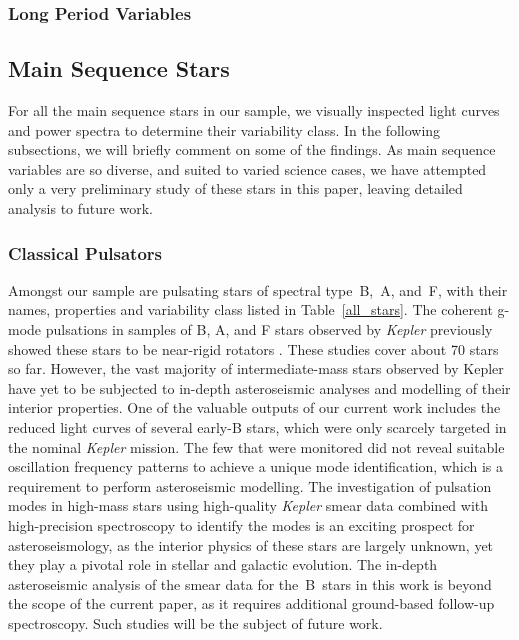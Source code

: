 \documentclass[a4paper,fleqn,usenatbib]{mnras}
\newcommand{\kepler}{\emph{Kepler}\xspace}
\begin{document}
\subsubsection{Long Period Variables}
\label{lpvs}

\subsection{Main Sequence Stars}
\label{mainseq}

For all the main sequence stars in our sample, we visually inspected light curves and power spectra to determine their variability class. In the following subsections, we will briefly comment on some of the findings. As main sequence variables are so diverse, and suited to varied science cases, we have attempted only a very preliminary study of these stars in this paper, leaving detailed analysis to future work.

\subsubsection{Classical Pulsators}
\label{pulsators}

Amongst our sample are pulsating stars of spectral type~B,~A, and~F, with their names, properties and variability class listed in Table~\ref{all_stars}. The coherent g-mode pulsations in samples of B, A, and F stars observed by \kepler previously showed these stars to be near-rigid rotators \citep{kurtz2014,saio15,triana15,vanreeth15,vanreeth16,vanreeth18,murphy16,schmid16,moravveji16,ouazzani17,papics17,aerts17,szewczuk18}. These studies cover about 70 stars so far. However, the vast majority of intermediate-mass stars observed by Kepler have yet to be subjected to in-depth asteroseismic analyses and modelling of their interior properties. One of the valuable outputs of our current work includes the reduced light curves of several early-B stars, which were only scarcely targeted in the nominal \kepler mission. The few that were monitored did not reveal suitable oscillation frequency patterns to achieve a unique mode identification, which is a requirement to perform asteroseismic modelling. The investigation of pulsation modes in high-mass stars using high-quality \kepler smear data combined with high-precision spectroscopy to identify the modes \citep[Chapter 6]{aertsbook} is an exciting prospect for asteroseismology, as the interior physics of these stars are largely unknown, yet they play a pivotal role in stellar and galactic evolution. The in-depth asteroseismic analysis of the smear data for the~B~stars in this work is beyond the scope of the current paper, as it requires additional ground-based follow-up spectroscopy. Such studies will be the subject of future work.
\end{document}
